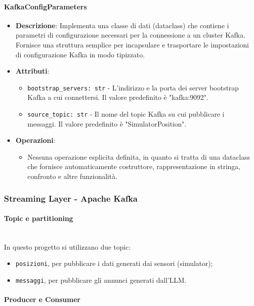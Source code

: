 \documentclass[10pt]{article}
\newcommand{\myparagraph}[1]{\paragraph{#1}\mbox{}\\}
\begin{document}
    \paragraph{KafkaConfigParameters}
    \begin{itemize} 
    \item \textbf{Descrizione}: Implementa una classe di dati (dataclass) che contiene i parametri di configurazione necessari per la connessione a un cluster Kafka. Fornisce una struttura semplice per incapsulare e trasportare le impostazioni di configurazione Kafka in modo tipizzato.
    \item \textbf{Attributi}:
    \begin{itemize}
        \item \texttt{bootstrap\_servers: str} - L'indirizzo e la porta dei server bootstrap Kafka a cui connettersi. Il valore predefinito è "kafka:9092".
        \item \texttt{source\_topic: str} - Il nome del topic Kafka su cui pubblicare i messaggi. Il valore predefinito è "SimulatorPosition".
    \end{itemize}
    
    \item \textbf{Operazioni}:
    \begin{itemize}
        \item Nessuna operazione esplicita definita, in quanto si tratta di una dataclass che fornisce automaticamente costruttore, rappresentazione in stringa, confronto e altre funzionalità.
    \end{itemize}
    \end{itemize}
    
    \newpage

    \subsubsection{Streaming Layer - Apache Kafka}
        
        \myparagraph{Topic e partitioning}
        In questo progetto si utilizzano due topic:
        \begin{itemize}
        \item \texttt{posizioni}, per pubblicare i dati generati dai sensori (simulator);
        \item \texttt{messaggi}, per pubblicare gli annunci generati dall’LLM.
        \end{itemize}

        \myparagraph{Producer e Consumer}
\end{document}

